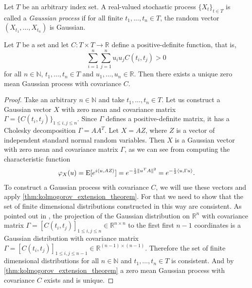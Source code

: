 \begin{definition}
    Let $T$ be an arbitrary index set. A real-valued stochastic process \( \{X_{t}\}_{t \in T} \) is called a \textit{Gaussian process} if for all finite \( t_{1}, \dots, t_{n} \in T \), the random vector \( (X_{t_{1}}, \dots, X_{t_{n}}) \) is Gaussian.
\end{definition}
%
\begin{theorem}
    Let $T$ be a set and let \( C \colon T \times T \to \mathbb{R} \) define a positive-definite function,
    that is,
    \[
        \sum_{i=1}^{n} \sum_{j=1}^{n}  u_{i} u_{j} C(t_{i},t_{j}) > 0
    \]
    for all \( n \in \mathbb{N} \), \( t_{1}, \dots, t_{n} \in T \) and \( u_{1}, \dots, u_{n} \in \mathbb{R} \).
    Then there exists a unique zero mean Gaussian process with covariance $C$.
\end{theorem}
\begin{proof}
    Take an arbitrary \( n \in \mathbb{N} \) and take \( t_{1}, \dots, t_{n} \in T  \). 
    Let us construct a Gaussian vector $X$ with zero mean and covariance matrix \( \Gamma = \{C(t_{i},t_{j})\}_{1 \leq i,j \leq n} \). Since $\Gamma$ defines a positive-definite matrix, it has a Cholesky decomposition \( \Gamma = A A^{T} \). Let \( X = A Z \), where $Z$ is a vector of independent standard normal random variables. Then $X$ is a Gaussian vector with zero mean and covariance matrix $\Gamma$, as we can see from computing the characteristic function
    \[
        \varphi_{X}(u) = \operatorname*{E}[e^{i \langle u,AZ\rangle}] = e^{-\frac{1}{2} \lVert u^{T} A \rVert^{2}}
        =e^{- \frac{1}{2} \langle u, \Gamma u \rangle}.
    \]
    To construct a Gaussian process with covariance $C$, we will use these vectors and apply \cref{thm:kolmogorov_extension_theorem}.
    For that we need to show that the set of finite dimensional distributions constructed in this way are consistent.
    As pointed out in \cite{chen2020remarks}, the projection of the Gaussian distribution on $\mathbb{R}^{n}$ with covariance matrix $\Gamma = [C(t_{i},t_{j})]_{1 \leq i,j \leq n}  \in \mathbb{R}^{n \times n}$ to the first first $n-1$ coordinates is a Gaussian distribution with covariance matrix $\Gamma = [C(t_{i},t_{j})]_{1 \leq i,j \leq n-1} \in \mathbb{R}^{(n-1)\times (n-1)}$.
    Therefore the set of finite dimensional distributions for all $n \in \mathbb{N}$ and \( t_{1}, \dots, t_{n} \in T  \) is consistent.
    And by \cref{thm:kolmogorov_extension_theorem} a zero mean Gaussian process with covariance $C$ exists and is unique. 
\end{proof}
